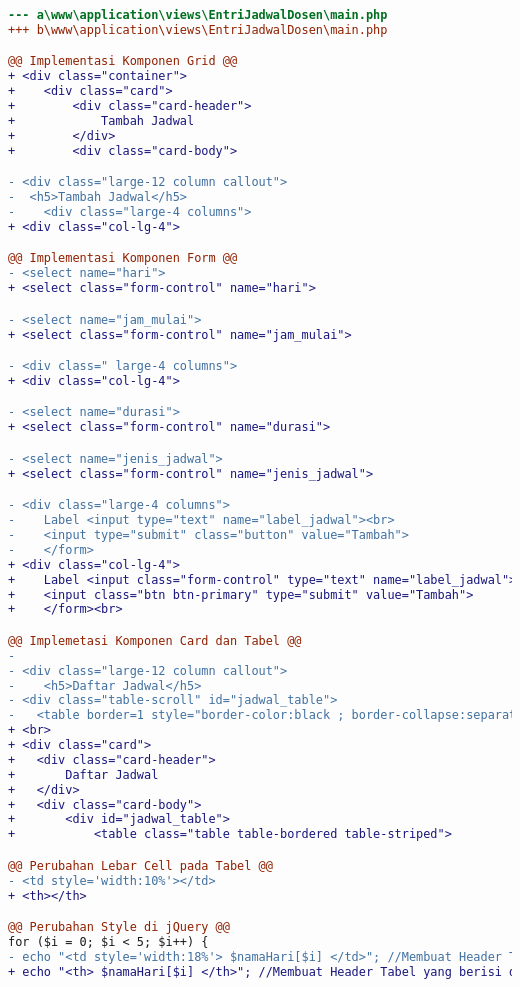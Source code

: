 \begin{lstlisting}[language=diff, caption=Kode untuk Halaman Entri Jadwal Dosen, label=Entri, basicstyle=\ttfamily, frame=single,
columns=fullflexible, keepspaces=true, breaklines=true]
--- a\www\application\views\EntriJadwalDosen\main.php
+++ b\www\application\views\EntriJadwalDosen\main.php

@@ Implementasi Komponen Grid @@
+ <div class="container">
+    <div class="card">
+        <div class="card-header">
+            Tambah Jadwal
+        </div>
+        <div class="card-body">

- <div class="large-12 column callout">
-  <h5>Tambah Jadwal</h5>
-    <div class="large-4 columns">
+ <div class="col-lg-4">

@@ Implementasi Komponen Form @@
- <select name="hari"> 
+ <select class="form-control" name="hari">

- <select name="jam_mulai"> 
+ <select class="form-control" name="jam_mulai">

- <div class=" large-4 columns">
+ <div class="col-lg-4">

- <select name="durasi"> 
+ <select class="form-control" name="durasi">

- <select name="jenis_jadwal"> 
+ <select class="form-control" name="jenis_jadwal">

- <div class="large-4 columns">
-    Label <input type="text" name="label_jadwal"><br>
-    <input type="submit" class="button" value="Tambah">
-    </form>
+ <div class="col-lg-4">
+    Label <input class="form-control" type="text" name="label_jadwal"><br><br>
+    <input class="btn btn-primary" type="submit" value="Tambah">
+    </form><br>

@@ Implemetasi Komponen Card dan Tabel @@
-
- <div class="large-12 column callout">
-    <h5>Daftar Jadwal</h5>
- <div class="table-scroll" id="jadwal_table">
-	<table border=1 style="border-color:black ; border-collapse:separate">
+ <br>
+ <div class="card">
+ 	<div class="card-header">
+    	Daftar Jadwal
+ 	</div>
+ 	<div class="card-body">
+   	<div id="jadwal_table">
+        	<table class="table table-bordered table-striped">

@@ Perubahan Lebar Cell pada Tabel @@
- <td style='width:10%'></td>
+ <th></th>

@@ Perubahan Style di jQuery @@
for ($i = 0; $i < 5; $i++) {
- echo "<td style='width:18%'> $namaHari[$i] </td>"; //Membuat Header Tabel yang berisi daftar hari
+ echo "<th> $namaHari[$i] </th>"; //Membuat Header Tabel yang berisi daftar hari


\end{lstlisting}
